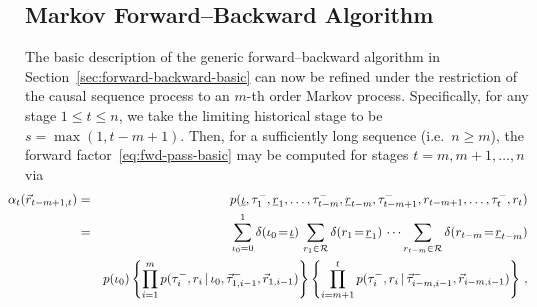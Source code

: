 \documentclass[a4paper]{article}
\newcommand{\ui}{\underline{\iota}}
\newcommand{\ur}{\underline{r}}
\newcommand{\vr}{\vec{r}}
\newcommand{\tm}{\tau^{-}}
\begin{document}
\subsection{Markov Forward--Backward Algorithm}
\label{sec:forward-backward-markov}

The basic description of the generic forward--backward algorithm in Section~\ref{sec:forward-backward-basic}
can now be refined under the restriction of the causal sequence process to an $m$-th order Markov process.
Specifically, for any stage $1\le t\le n$, we take the limiting historical stage to be $s=\max(1, t-m+1)$.
Then, for a sufficiently long sequence (i.e.\ $n\ge m$), the forward factor~\eqref{eq:fwd-pass-basic} may be
computed for stages $t=m,m+1,\ldots,n$ via
\begin{eqnarray}
\hspace*{-5mm}
\alpha_t(\vr_{t-m+1,t}) & = & p(\ui,\tm_1,\ur_1,\ldots,\tm_{t-m},\ur_{t-m},\tm_{t-m+1},r_{t-m+1},\ldots,\tm_t,r_t)
\nonumber\\& = &
\sum_{\iota_0=0}^{1}\delta(\iota_0\!=\!\ui)\,
\sum_{r_1\in{\cal R}} \delta(r_1\!=\!\ur_1)\,
\cdots
\sum_{r_{t-m}\in{\cal R}} \delta(r_{t-m}\!=\!\ur_{t-m})
\nonumber\\&&
p(\iota_0)\left\{\prod_{i=1}^{m}p(\tm_i,r_i\,|\,\iota_0,\vec{\tau}^-_{1,i-1},\vr_{1,i-1})\right\}
\left\{\prod_{i=m+1}^{t}p(\tm_i,r_i\,|\,\vec{\tau}^-_{i-m,i-1},\vr_{i-m,i-1})\right\}\,,
\label{eq:fwd-pass-m}
\end{eqnarray}
\end{document}
